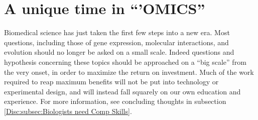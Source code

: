 \section{A unique time in ``'OMICS''}
  \label{Intro:sec:Unique Time in Omics}

  Biomedical science has just taken the first few steps into a new era. Most questions, including those of gene expression, molecular interactions, and evolution should no longer be asked on a small scale. Indeed questions and hypothesis concerning these topics should be approached on a ``big scale'' from the very onset, in order to maximize the return on investment. Much of the work required to reap maximum benefits will not be put into technology or experimental design, and will instead fall squarely on our own education and experience. For more information, see concluding thoughts in subsection \ref{Disc:subsec:Biologists need Comp Skills}.


